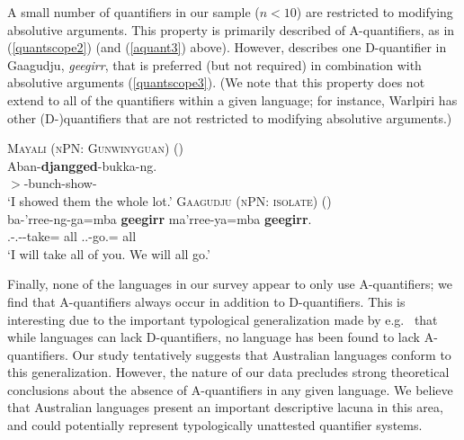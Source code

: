 \documentclass[12pt,egregdoesnotlikesansseriftitles]{scrartcl}
\begin{document}
A small number of quantifiers in our sample ($ n < 10$) are restricted to modifying absolutive arguments. This property is primarily described of A-quantifiers, as in (\ref{quantscope2}) (and (\ref{aquant3}) above). However, \cite{harvey92} describes one D-quantifier in Gaagudju, \textit{geegirr}, that is preferred (but not required) in combination with absolutive arguments (\ref{quantscope3}). (We note that this property does not extend to all of the quantifiers within a given language; for instance, Warlpiri has other (D-)quantifiers that are not restricted to modifying absolutive arguments.)

\begin{exe}
  \ex\textsc{Mayali (nPN: Gunwinyguan)} \hfill(\citealt[233]{evans95})\\
  \gll Aban-\textbf{djangged}-bukka-ng.\\
  \First$>$\Tpl-bunch-show-\Pp\\
  \glt `I showed them the whole lot.' \label{quantscope2}
  \ex\textsc{Gaagudju (nPN: isolate)} \hfill(\citealt[307]{harvey92})\\
  \gll ba-'rree-ng-ga=mba \textbf{geegirr} ma'rree-ya=mba \textbf{geegirr}.\\ 
  \Second.\Abs-\First.\Erg-\Fut-take=\Aug{} all \First.\Incl.\Abs-go.\Fut=\Aug{} all\\
  \glt `I will take all of you. We will all go.' \label{quantscope3}
\end{exe}

Finally, none of the languages in our survey appear to only use A-quantifiers; we find that A-quantifiers always occur in addition to D-quantifiers. This is  interesting due to the important typological generalization made by e.g.\ \cite{introqnl} that  while languages can lack D-quantifiers, no language has been found to lack A-quantifiers. Our study tentatively suggests that Australian languages  conform to this generalization. However, the nature of our data precludes strong theoretical conclusions about the absence of A-quantifiers in any given language. We believe that Australian languages present an important descriptive lacuna in this area, and could potentially represent typologically unattested quantifier systems.
\end{document}
